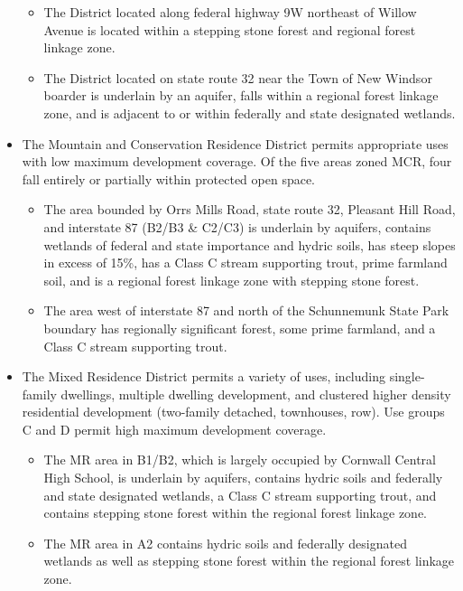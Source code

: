 \begin{itemize}
    \begin{itemize}
        \item The District located along federal highway 9W northeast of Willow Avenue is located within a stepping stone forest and regional forest linkage zone.
        \item The District located on state route 32 near the Town of New Windsor boarder is underlain by an aquifer, falls within a regional forest linkage zone, and is adjacent to or within federally and state designated wetlands.
        \end{itemize}
    \item The Mountain and Conservation Residence District permits appropriate uses with low maximum development coverage.  Of the five areas zoned MCR, four fall entirely or partially within protected open space.
    \begin{itemize}
        \item The area bounded by Orrs Mills Road, state route 32, Pleasant Hill Road, and interstate 87 (B2/B3 \& C2/C3) is underlain by aquifers, contains wetlands of federal and state importance and hydric soils, has steep slopes in excess of 15\%, has a Class C stream supporting trout, prime farmland soil, and is a regional forest linkage zone with stepping stone forest.
        \item The area west of interstate 87 and north of the Schunnemunk State Park boundary has regionally significant forest, some prime farmland, and a Class C stream supporting trout.
        \end{itemize}
    \item The Mixed Residence District permits a variety of uses, including single-family dwellings, multiple dwelling development, and clustered higher density residential development (two-family detached, townhouses, row). Use groups C and D permit high maximum development coverage.
    \begin{itemize}
        \item The MR area in B1/B2, which is largely occupied by Cornwall Central High School, is underlain by aquifers, contains hydric soils and federally and state designated wetlands, a Class C stream supporting trout, and contains stepping stone forest within the regional forest linkage zone.
        \item The MR area in A2 contains hydric soils and federally designated wetlands as well as stepping stone forest within the regional forest linkage zone.
        \end{itemize}

\end{itemize}
